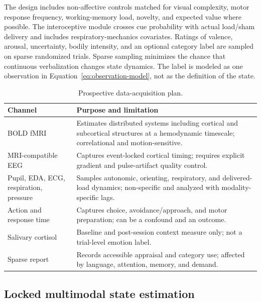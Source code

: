 \documentclass[conference]{IEEEtran}
\begin{document}
The design includes non-affective controls matched for visual complexity, motor response frequency, working-memory load, novelty, and expected value where possible. The interoceptive module crosses cue probability with actual load/sham delivery and includes respiratory-mechanics covariates. Ratings of valence, arousal, uncertainty, bodily intensity, and an optional category label are sampled on sparse randomized trials. Sparse sampling minimizes the chance that continuous verbalization changes state dynamics. The label is modeled as one observation in Equation~\eqref{eq:observation-model}, not as the definition of the state.

\begin{table}[!t]
\caption{Prospective data-acquisition plan.}\label{tab:acquisition}
\centering
\footnotesize
\begin{tabular}{p{}p{}}
\toprule
Channel & Purpose and limitation \\
\midrule
BOLD fMRI & Estimates distributed systems including cortical and subcortical structures at a hemodynamic timescale; correlational and motion-sensitive. \\
MRI-compatible EEG & Captures event-locked cortical timing; requires explicit gradient and pulse-artifact quality control. \\
Pupil, EDA, ECG, respiration, pressure & Samples autonomic, orienting, respiratory, and delivered-load dynamics; non-specific and analyzed with modality-specific lags. \\
Action and response time & Captures choice, avoidance/approach, and motor preparation; can be a confound and an outcome. \\
Salivary cortisol & Baseline and post-session context measure only; not a trial-level emotion label. \\
Sparse report & Records accessible appraisal and category use; affected by language, attention, memory, and demand. \\
\bottomrule
\end{tabular}
\end{table}

\subsection{Locked multimodal state estimation}
\end{document}
